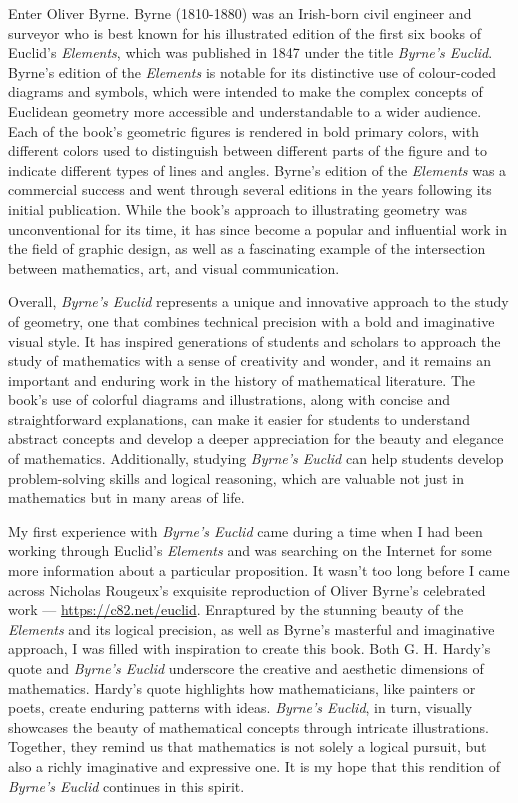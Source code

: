 \documentclass[twoside,12pt]{report}
\begin{document}
Enter Oliver Byrne.  Byrne (1810-1880) was an Irish-born civil engineer and surveyor who is best known for his illustrated edition of the first six books of Euclid's \textit{Elements}, which was published in 1847 under the title \textit{Byrne's Euclid}.  Byrne's edition of the \textit{Elements} is notable for its distinctive use of colour-coded diagrams and symbols, which were intended to make the complex concepts of Euclidean geometry more accessible and understandable to a wider audience. Each of the book's geometric figures is rendered in bold primary colors, with different colors used to distinguish between different parts of the figure and to indicate different types of lines and angles.  Byrne's edition of the \textit{Elements} was a commercial success and went through several editions in the years following its initial publication. While the book's approach to illustrating geometry was unconventional for its time, it has since become a popular and influential work in the field of graphic design, as well as a fascinating example of the intersection between mathematics, art, and visual communication.

Overall, \textit{Byrne's Euclid} represents a unique and innovative approach to the study of geometry, one that combines technical precision with a bold and imaginative visual style. It has inspired generations of students and scholars to approach the study of mathematics with a sense of creativity and wonder, and it remains an important and enduring work in the history of mathematical literature.  The book's use of colorful diagrams and illustrations, along with concise and straightforward explanations, can make it easier for students to understand abstract concepts and develop a deeper appreciation for the beauty and elegance of mathematics. Additionally, studying \textit{Byrne's Euclid} can help students develop problem-solving skills and logical reasoning, which are valuable not just in mathematics but in many areas of life.

My first experience with \textit{Byrne's Euclid} came during a time when I had been working through Euclid's \textit{Elements} and was searching on the Internet for some more information about a particular proposition.  It wasn't too long before I came across Nicholas Rougeux's exquisite reproduction of Oliver Byrne's celebrated work --- \url{https://c82.net/euclid}.  Enraptured by the stunning beauty of the \textit{Elements} and its logical precision, as well as Byrne's masterful and imaginative approach, I was filled with inspiration to create this book.  Both G. H. Hardy's quote and \textit{Byrne's Euclid} underscore the creative and aesthetic dimensions of mathematics. Hardy's quote highlights how mathematicians, like painters or poets, create enduring patterns with ideas. \textit{Byrne's Euclid}, in turn, visually showcases the beauty of mathematical concepts through intricate illustrations. Together, they remind us that mathematics is not solely a logical pursuit, but also a richly imaginative and expressive one.  It is my hope that this rendition of \textit{Byrne's Euclid} continues in this spirit.
\end{document}
